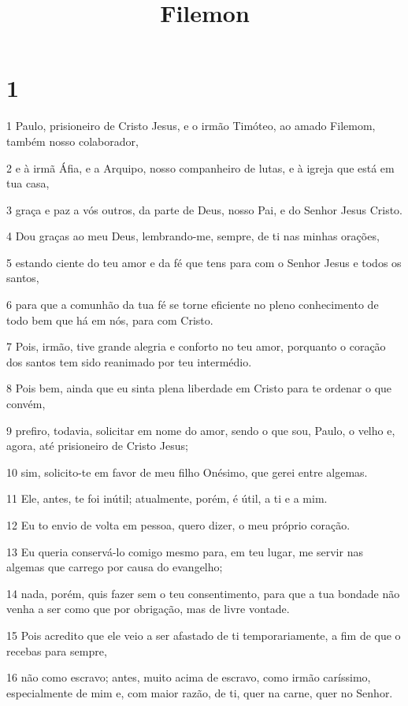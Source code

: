 

\title{Filemon}


\chapter{1}

\par 1 Paulo, prisioneiro de Cristo Jesus, e o irmão Timóteo, ao amado Filemom, também nosso colaborador,
\par 2 e à irmã Áfia, e a Arquipo, nosso companheiro de lutas, e à igreja que está em tua casa,
\par 3 graça e paz a vós outros, da parte de Deus, nosso Pai, e do Senhor Jesus Cristo.
\par 4 Dou graças ao meu Deus, lembrando-me, sempre, de ti nas minhas orações,
\par 5 estando ciente do teu amor e da fé que tens para com o Senhor Jesus e todos os santos,
\par 6 para que a comunhão da tua fé se torne eficiente no pleno conhecimento de todo bem que há em nós, para com Cristo.
\par 7 Pois, irmão, tive grande alegria e conforto no teu amor, porquanto o coração dos santos tem sido reanimado por teu intermédio.
\par 8 Pois bem, ainda que eu sinta plena liberdade em Cristo para te ordenar o que convém,
\par 9 prefiro, todavia, solicitar em nome do amor, sendo o que sou, Paulo, o velho e, agora, até prisioneiro de Cristo Jesus;
\par 10 sim, solicito-te em favor de meu filho Onésimo, que gerei entre algemas.
\par 11 Ele, antes, te foi inútil; atualmente, porém, é útil, a ti e a mim.
\par 12 Eu to envio de volta em pessoa, quero dizer, o meu próprio coração.
\par 13 Eu queria conservá-lo comigo mesmo para, em teu lugar, me servir nas algemas que carrego por causa do evangelho;
\par 14 nada, porém, quis fazer sem o teu consentimento, para que a tua bondade não venha a ser como que por obrigação, mas de livre vontade.
\par 15 Pois acredito que ele veio a ser afastado de ti temporariamente, a fim de que o recebas para sempre,
\par 16 não como escravo; antes, muito acima de escravo, como irmão caríssimo, especialmente de mim e, com maior razão, de ti, quer na carne, quer no Senhor.
